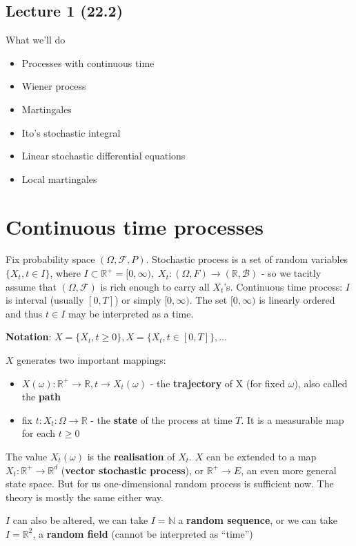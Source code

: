 \documentclass[english]{article}
\newcommand{\R}{\mathbb{R}}
\newcommand{\N}{\mathbb{N}}
\newcommand{\note}[1]{\noindent\textbf{#1}}
\newcommand{\F}{\mathcal F}
\newcommand{\B}{\mathcal B}
\begin{document}
\subsection*{Lecture 1 (22.2)}
What we'll do
\begin{itemize}
\item Processes with continuous time
\item Wiener process
\item Martingales
\item Ito's stochastic integral
\item Linear stochastic differential equations
\item Local martingales
\end{itemize}

\section{Continuous time processes}
Fix probability space $(\Omega, \F, P)$. Stochastic process is a set of random variables $\{X_t, t\in I\}$, where $I\subset \R^+ = [0,\infty),\; X_t:(\Omega, F) \to (\R,\B)$ - so we tacitly assume that $(\Omega, \F)$ is rich enough to carry all $X_t$'s. \newline
Continuous time process: $I$ is interval (usually $[0,T]$) or simply $[0,\infty)$. The set $[0,\infty)$ is linearly ordered and thus $t\in I$ may be interpreted as a time.\newline

\note{Notation}: $X=\{X_t, t\geq 0\}, X=\{X_t, t\in [0,T]\},\dots$ \newline

\noindent $X$ generates two important mappings:
\begin{itemize}
\item $X(\omega): \R^+ \to \R, t \to X_t (\omega)$ - the \textbf{trajectory} of X (for fixed $\omega$), also called the \textbf{path}
\item fix $t: X_t: \Omega \to \R$ - the \textbf{state} of the process at time $T$. It is a measurable map for each $t\geq 0$
\end{itemize}
The value $X_t(\omega)$ is the \textbf{realisation} of $X_t$. $X$ can be extended to a map $X_t: \R^+\to \R^d$ (\textbf{vector stochastic process}), or $\R^+ \to E$, an even more general state space. But for us one-dimensional random process is sufficient now. The theory is mostly the same either way. \newline

\noindent $I$ can also be altered, we can take $I=\N$ a \textbf{random sequence}, or we can take $I=\R^2$, a \textbf{random field} (cannot be interpreted as ``time'')\newline
\end{document}
